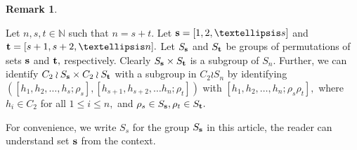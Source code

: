 \documentclass[12pt,twoside,reqno]{amsart}
\theoremstyle{definition}
\newtheorem{remark}[theorem]{Remark}
\numberwithin{equation}{section}
\begin{document}
\begin{remark}\label{Remark_split}

Let $n,s,t\in \mathbb N$ such that $n=s+t.$
Let ${\bf s}=[1,2,\dots s]$ and ${\bf t}=[s+1, s+2, \dots n].$ Let $S_{\bf s}$ and $S_{\bf t}$ be groups of permutations of sets $\bf s$ and $\bf t,$ respectively. Clearly $S_{\bf s} \times S_{\bf t}$ is a subgroup of $S_n.$ Further, we can identify $C_2 \wr S_{\bf s} \times C_2 \wr S_{\bf t}$ with a subgroup in $C_2 \wr S_n$ by identifying $([h_1, h_2, \dots, h_s; \rho_s], [h_{s+1}, h_{s+2},\dots h_n; \rho_t])$ with $[h_1, h_2, \dots, h_n; \rho_s\rho_t],$ where $h_i \in C_2$ for all $1\leq i \leq n,$ and $\rho_s \in S_{\bf s}, \rho_t \in S_{\bf t}.$ 

For convenience, we write $S_s$ for the group $S_{\bf s}$ in this article, the reader can understand set ${\bf s}$  from the context. 
\end{remark}
\end{document}

